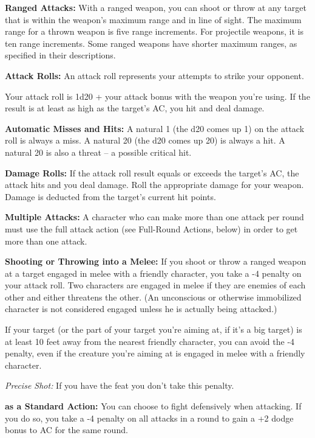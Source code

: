 \textbf{Ranged Attacks:} With a ranged weapon, you can shoot or throw at any target 
that is within the weapon's maximum range and in line of sight. The maximum range 
for a thrown weapon is five range increments. For projectile weapons, it is ten 
range increments. Some ranged weapons have shorter maximum ranges, as specified 
in their descriptions.

\textbf{Attack Rolls:} An attack roll represents your attempts to strike your opponent. 

Your attack roll is 1d20 + your attack bonus with the weapon you're using. If the 
result is at least as high as the target's AC, you hit and deal damage.

\textbf{Automatic Misses and Hits:} A natural 1 (the d20 comes up 1) on the attack 
roll is always a miss. A natural 20 (the d20 comes up 20) is always a hit. A natural 
20 is also a threat -- a possible critical hit.

\textbf{Damage Rolls:} If the attack roll result equals or exceeds the target's 
AC, the attack hits and you deal damage. Roll the appropriate damage for your weapon. 
Damage is deducted from the target's current hit points.

\textbf{Multiple Attacks:} A character who can make more than one attack per round 
must use the full attack action (see Full-Round Actions, below) in order to get 
more than one attack.

\textbf{Shooting or Throwing into a Melee:} If you shoot or throw a ranged weapon 
at a target engaged in melee with a friendly character, you take a -4 penalty on 
your attack roll. Two characters are engaged in melee if they are enemies of each 
other and either threatens the other. (An unconscious or otherwise immobilized 
character is not considered engaged unless he is actually being attacked.)

If your target (or the part of your target you're aiming at, if it's a big target) 
is at least 10 feet away from the nearest friendly character, you can avoid the 
-4 penalty, even if the creature you're aiming at is engaged in melee with a friendly 
character.

\textit{Precise Shot:} If you have the  feat you don't take this penalty.

\textbf{ as a Standard Action:} You can choose to fight defensively 
when attacking. If you do so, you take a -4 penalty on all attacks in a round to 
gain a +2 dodge bonus to AC for the same round.

